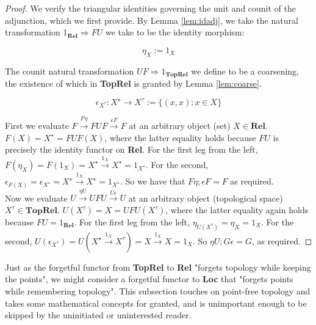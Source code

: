 \begin{proposition}[$F \dashv U$]
\begin{proof}
We verify the triangular identities governing the unit and counit of the adjunction, which we first provide. By Lemma \ref{lem:idadj}, we take the natural transformation $1_\mathbf{Rel} \Rightarrow FU$ we take to be the identity morphism:

\[\eta_{X} := 1_{X}\]

The counit natural transformation $UF \Rightarrow 1_{\mathbf{TopRel}}$ we define to be a coarsening, the existence of which in \textbf{TopRel} is granted by Lemma \ref{lem:coarse}.

\[\epsilon_{X^\tau} : X^\star \rightarrow X^\tau := \{(x,x) : x \in X\}\]

First we evaluate $F \overset{F\eta}{\rightarrow} FUF \overset{\epsilon F}{\rightarrow} F$ at an arbitrary object (set) $X \in \textbf{Rel}$. $F(X) = X^\star = FUF(X)$, where the latter equality holds because $FU$ is precisely the identity functor on \textbf{Rel}. For the first leg from the left, $F(\eta_X) = F(1_X) = X^\star \overset{1_X}{\rightarrow} X^\star = 1_{X^\star}$. For the second, $\epsilon_{F(X)} = \epsilon_{X^\star} = X^\star \overset{1_X}{\rightarrow} X^\star = 1_{X^\star}$. So we have that $F\eta ; \epsilon F = F$ as required.\\

Now we evaluate $U \overset{\eta U}{\rightarrow} UFU \overset{U \epsilon}{\rightarrow} U$ at an arbitrary object (topological space) $X^\tau \in \textbf{TopRel}$. $U(X^\tau) = X = UFU(X^\tau)$, where the latter equality again holds because $FU = 1_\textbf{Rel}$. For the first leg from the left, $\eta_{U(X^\tau)} = \eta_X = 1_{X}$. For the second, $U(\epsilon_{X^\tau}) = U(X^\star \overset{1_X}{\rightarrow} X^\tau) = X \overset{1_X}{\rightarrow} X = 1_X$. So $\eta U ; G \epsilon = G$, as required.
\end{proof}
\end{proposition}


Just as the forgetful functor from \textbf{TopRel} to \textbf{Rel} "forgets topology while keeping the points", we might consider a forgetful functor to \textbf{Loc} that "forgets points while remembering topology". This subsection touches on point-free topology and takes some mathematical concepts for granted, and is unimportant enough to be skipped by the uninitiated or uninterested reader.

